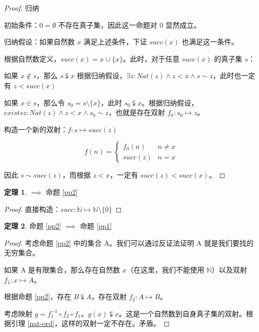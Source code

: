 \documentclass{ctexart}
\theoremstyle{definition}
\newtheorem{theorem}{定理}[section]
\begin{document}
\begin{proof}
  归纳

  初始条件：$0 = \emptyset$ 不存在真子集，因此这一命题对 0 显然成立。

  归纳假设：如果自然数 $x$ 满足上述条件，下证 $succ(x)$ 也满足这一条件。

  根据自然数定义，$succ(x) = x \cup \{x\}$。此时，对于任意 $succ(x)$ 的真子集 $s$：

  如果 $x \notin s$，那么 $s \subsetneqq x$ 根据归纳假设，$\exists z: Nat(z) \land z < x \land s \sim z$，此时也一定有 $z < succ(x)$

  如果 $x \in s$，那么令 $s_0 = s \setminus \{ x \}$，此时 $s_0 \subsetneqq x$。根据归纳假设，$exists z: Nat(z) \land z < x \land s_0 \sim z$，也就是存在双射 $f_0: s_0 \mapsto z$。

  构造一个新的双射：$f: s \mapsto succ(z)$

  $$
    f(n) = \begin{cases}
      f_0(n) & n \neq x \\
      succ(z) & n = x
    \end{cases}
  $$

  因此 $s \sim succ(z)$，而根据 $z < x$，一定有 $succ(z) < succ(x)$。
\end{proof}

\begin{theorem}
   $\implies$ 命题 \ref{pp2}
\end{theorem}

\begin{proof}
  直接构造：$succ: \mathbb{N} \mapsto \mathbb{N} \setminus \{0\}$
\end{proof}

\begin{theorem}
  命题 \ref{pp2} $\implies$ 命题 \ref{pp1}
\end{theorem}

\begin{proof}
  考虑命题 \ref{pp2} 中的集合 A。我们可以通过反证法证明 A 就是我们要找的无穷集合。

  如果 A 是有限集合，那么存在自然数 $x$（在这里，我们不能使用 $\mathbb{N}$）以及双射 $f_1: x \mapsto A$。

  根据命题 \ref{pp2}，存在 $B \subsetneqq A$，存在双射 $f_2: A \mapsto B$。

  考虑映射 $g = f_1^{-1} \circ f_2 \circ f_1$。$g(x) \subsetneqq x$。这是一个自然数到自身真子集的双射。根据引理 \ref{nat-ord}，这样的双射一定不存在。矛盾。
\end{proof}
\end{document}
